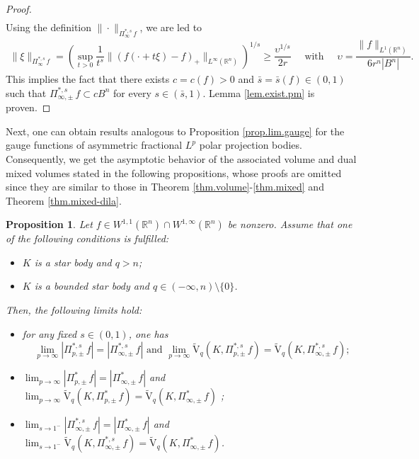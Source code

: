 \documentclass[11pt, reqno]{article}
\newtheorem{proposition}[theorem]{Proposition}
\theoremstyle{definition}
\numberwithin{equation}{section}
\newcommand{\R}{\mathbb{R}}
\newcommand{\vtil}{\widetilde{\mathrm{V}}}
\begin{document}
\begin{proof}
\begin{align*}
	\end{align*}
Using the definition $\| \cdot \|_{\Pi^{\ast, s}_\infty \, f}$, we are led to
	\begin{align*}
		\| \xi \|_{\Pi^{\ast, s}_\infty \, f} = \left( \sup_{t > 0} \dfrac{1}{t^s} \| (f(\cdot + t\xi) - f)_+ \|_{L^\infty(\R^n)} \right)^{1/s} \geq \dfrac{\upsilon^{1/s}}{2r} 
		\quad \text{ with } \quad
		\upsilon = \dfrac{\| f \|_{L^1(\R^n)}}{6r^n |B^n|}.
	\end{align*}
This implies the fact that there exists $c = c(f) > 0$ and $\bar s = \bar s(f) \in (0, 1)$ such that $\Pi^{\ast, s}_{\infty, \pm} \, f \subset c B^n$ for every $s \in (\bar s, 1)$.
Lemma \ref{lem.exist.pm} is proven.
\end{proof}

Next, one can obtain results  analogous to Proposition \ref{prop.lim.gauge} for the gauge functions of asymmetric fractional $L^p$ polar projection bodies.
Consequently, we get the asymptotic behavior of the associated volume and dual mixed volumes stated in the following propositions, whose proofs are omitted since they are similar to those in Theorem \ref{thm.volume}-\ref{thm.mixed} and Theorem \ref{thm.mixed-dila}.

\begin{proposition}\label{prop.lim.pm}
    Let $f \in W^{1, 1}(\R^n) \cap W^{1, \infty}(\R^n)$ be nonzero.
    Assume that one of the following conditions is fulfilled:
	\begin{itemize}
		\item[(a)] $K$ is a star body and $q > n$;
		
		\item[(b)] $K$ is a bounded star body and $q \in (- \infty, n) \setminus \{ 0 \}$.
    \end{itemize}
    Then, the following limits hold:
    \begin{itemize}
        \item[(i)] for any fixed $s \in (0, 1)$, one has
        \[
        \textstyle\lim_{p \to \infty} |\Pi^{\ast, s}_{p, \pm} \, f| =  |\Pi^{\ast, s}_{\infty, \pm} \, f|
        \text{ and } 
        \textstyle\lim_{p \to \infty} \vtil_{q}(K, \Pi^{\ast, s}_{p, \pm} \, f) = \vtil_q(K, \Pi^{\ast, s}_{\infty, \pm} \, f);
        \]

        \item[(ii)] 
        $\textstyle\lim_{p \to \infty} |\Pi^\ast_{p, \pm} \, f| = |\Pi^\ast_{\infty, \pm} \, f|$ 
        and
        $\textstyle\lim_{p \to \infty} \vtil_q(K, \Pi^{\ast}_{p, \pm} \, f) = \vtil_q(K, \Pi^{\ast}_{\infty, \pm} \, f)$
        ;

        \item[(iii)] 
        $\textstyle\lim_{s \to 1^-} |\Pi^{\ast, s}_{\infty, \pm} \, f| = |\Pi^\ast_{\infty, \pm} \, f|$ 
        and
        $\textstyle\lim_{s \to 1^-} \vtil_q(K, \Pi^{\ast, s}_{\infty, \pm} \, f) = \vtil_q(K, \Pi^{\ast}_{\infty, \pm} \, f)$.
    \end{itemize}
\end{proposition}
\end{document}
